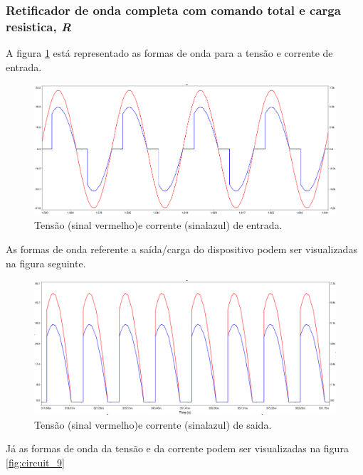 \documentclass[a4paper,11pt]{article}
\numberwithin{equation}{section}
\begin{document}
\subsubsection{Retificador de onda completa com comando total e carga resistica, \textit{R}}

A figura \ref{fig:circuit_7}  está representado as formas de onda para a tensão e corrente de entrada.

\begin{figure}[h]
	\centering
	\includegraphics[keepaspectratio=true, scale=0.4]{img/circuito5}
	\caption{Tensão (sinal vermelho)e corrente (sinalazul) de entrada.}
	\label{fig:circuit_7}
	\vspace{-0.8em}
\end{figure}

\pagebreak
As formas de onda referente a saída/carga do dispositivo podem ser visualizadas na figura seguinte.

\begin{figure}[h]
	\centering
	\includegraphics[keepaspectratio=true, scale=0.4]{img/circuito6}
	\caption{Tensão (sinal vermelho)e corrente (sinalazul) de saida.}
	\label{fig:circuit_8}
	\vspace{-0.8em}
\end{figure}

Já as formas de onda da tensão e da corrente podem ser visualizadas na figura  \ref{fig:circuit_9}
\end{document}
